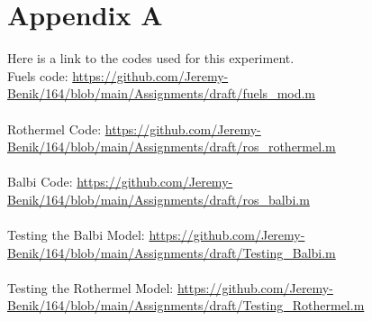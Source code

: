 \documentclass{article}
\begin{document}



\section{Appendix A}

Here is a link to the codes used for this experiment. \\
Fuels code: \url{https://github.com/Jeremy-Benik/164/blob/main/Assignments/draft/fuels_mod.m} \\
\\
Rothermel Code:  \url{https://github.com/Jeremy-Benik/164/blob/main/Assignments/draft/ros_rothermel.m} \\
\\
Balbi Code: \url{https://github.com/Jeremy-Benik/164/blob/main/Assignments/draft/ros_balbi.m} \\
\\
Testing the Balbi Model: \url{https://github.com/Jeremy-Benik/164/blob/main/Assignments/draft/Testing_Balbi.m}\\
\\
Testing the Rothermel Model: \url{https://github.com/Jeremy-Benik/164/blob/main/Assignments/draft/Testing_Rothermel.m}\\
\end{document}
